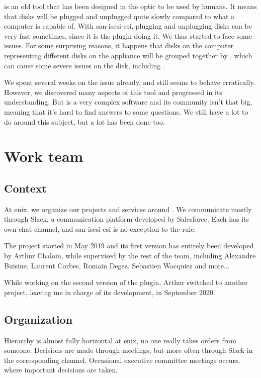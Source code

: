  is an old tool that has been designed in the optic to be used by humans. It means that disks will be plugged and unplugged quite slowly compared to what a computer is capable of. With \gls{san-iscsi-csi}, plugging and unplugging disks can be very fast sometimes, since it is the plugin doing it. We thus started to face some  issues. For some surprising reasons, it happens that disks on the computer representing different disks on the appliance will be grouped together by , which can cause some severe issues on the disk, including .

We spent several weeks on the issue already, and  still seems to behave erratically. However, we discovered many aspects of this tool and progressed in its understanding. But  is a very complex software and its community isn't that big, meaning that it's hard to find answers to some questions. We still have a lot to do around this subject, but a lot has been done too.

\section{Work team}

\subsection{Context}

At \gls{enix}, we organize our projects and services around . We communicate mostly through Slack, a communication platform developed by Salesforce. Each  has its own chat channel, and \gls{san-iscsi-csi} is no exception to the rule.

The project started in May 2019 and its first version has entirely been developed by Arthur Chaloin, while supervised by the rest of the team, including Alexandre Buisine, Laurent Corbes, Romain Degez, Sebastien Wacquiez and more...

While working on the second version of the plugin, Arthur switched to another project, leaving me in charge of its development, in September 2020.

\subsection{Organization}

Hierarchy is almost fully horizontal at \gls{enix}, no one really takes orders from someone. Decisions are made through meetings, but more often through Slack in the corresponding  channel. Occasional executive committee meetings occurs, where important decisions are taken.

